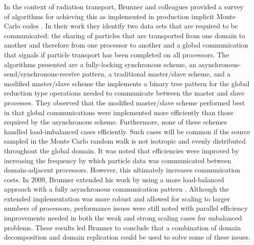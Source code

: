 In the context of radiation transport, Brunner and colleagues provided
a survey of algorithms for achieving this as implemented in production
implicit Monte Carlo codes \citep{brunner_comparison_2006}. In their
work they identify two data sets that are required to be communicated:
the sharing of particles that are transported from one domain to
another and therefore from one processor to another and a global
communication that signals if particle transport has been completed on
all processors. The algorithms presented are a fully-locking
synchronous scheme, an asynchronous-send/synchronous-receive pattern,
a traditional master/slave scheme, and a modified master/slave scheme
the implements a binary tree pattern for the global reduction type
operations needed to communicate between the master and slave
processes. They observed that the modified master/slave scheme
performed best in that global communications were implemented more
efficiently than those required by the asynchronous
scheme. Furthermore, none of these schemes handled load-imbalanced
cases efficiently. Such cases will be common if the source sampled in
the Monte Carlo random walk is not isotropic and evenly distributed
throughout the global domain. It was noted that efficiencies were
improved by increasing the frequency by which particle data was
communicated between domain-adjacent processors. However, this
ultimately increases communication costs. In 2009, Brunner extended
his work by using a more load-balanced approach with a fully
asynchronous communication pattern
\citep{brunner_efficient_2009}. Although the extended implementation
was more robust and allowed for scaling to larger numbers of
processors, performance issues were still noted with parallel
efficiency improvements needed in both the weak and strong scaling
cases for unbalanced problems. These results led Brunner to conclude
that a combination of domain decomposition and domain replication
could be used to solve some of these issues.

